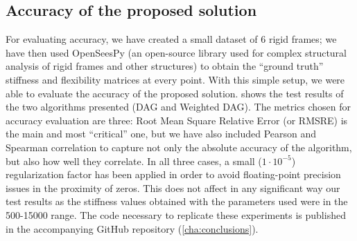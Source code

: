 \subsection{Accuracy of the proposed solution}

For evaluating accuracy, we have created a small dataset of 6 rigid frames; we have then used OpenSeesPy \cite{ZHU20186} 
(an open-source library used for complex structural analysis of rigid frames and other structures)
to obtain the ``ground truth'' stiffness and flexibility matrices at every point.
With this simple setup, we were able to evaluate the accuracy of the proposed solution.
 shows the test results of the two algorithms presented (DAG and Weighted DAG). The metrics chosen for accuracy evaluation are three: Root Mean Square Relative Error (or RMSRE)
is the main and most ``critical'' one, but we have also included Pearson and Spearman correlation
to capture not only the absolute accuracy of the algorithm, but also how well they correlate.
In all three cases, a small ($1 \cdot 10^{-5}$) regularization factor has been applied in order to avoid
floating-point precision issues in the proximity of zeros. This does not affect in any significant way our test results
as the stiffness values obtained with the parameters used were in the 500-15000 range.
The code necessary to replicate these experiments is published in the accompanying
GitHub repository (\cref{cha:conclusions}).


